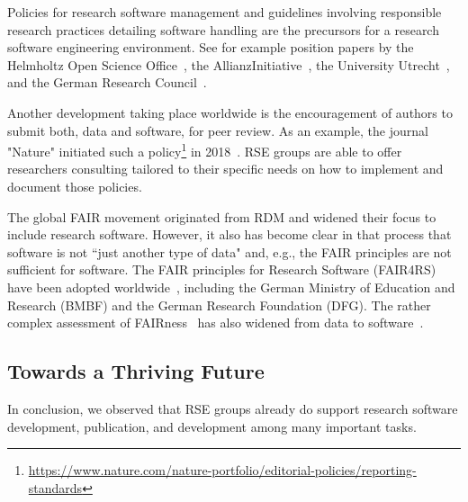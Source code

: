 \documentclass[a4paper]{article}
\begin{document}
Policies for research software management and guidelines involving responsible research practices detailing software handling are the precursors for a research software engineering environment.
See for example position papers by the Helmholtz Open Science Office~\autocite{Helmholtz2019a,Helmholtz2019b},
the AllianzInitiative~\autocite{Konrad2021},
the University Utrecht~\autocite{Utrecht2016b},
and the German Research Council~\autocite{dfg_gsp}.

Another development taking place worldwide is the encouragement of authors to submit both, data and software, for peer review. As an example, the journal "Nature" initiated such a policy\footnote{\url{https://www.nature.com/nature-portfolio/editorial-policies/reporting-standards}} in 2018~\autocite{Nature2018}.
RSE groups are able to offer researchers consulting tailored to their specific needs on how to implement and document those policies.

The global FAIR movement originated from RDM and widened their focus to include research software.
However, it also has become clear in that process that software is not “just another type of data" and, e.g., the FAIR principles are not sufficient for software.
The FAIR principles for Research Software (FAIR4RS)~\autocite{ChueHong2022} have been adopted worldwide~\autocite{Barker2024}, including the German Ministry of Education and Research (BMBF) and the German Research Foundation (DFG).
The rather complex assessment of FAIRness~\autocite{Wilkinson2023,FAIRmaturity} has also widened from data to software~\autocite{Lamprecht2020}.


\subsection{Towards a Thriving Future}

In conclusion, we observed that RSE groups already do support research software development, publication, and development among many important tasks. 
\end{document}
